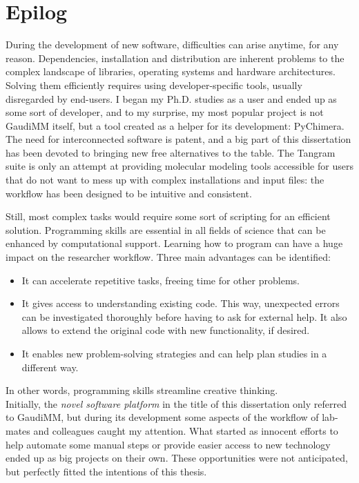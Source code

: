 \chapter*{Epilog}
\label{chap:epilog}

During the development of new software, difficulties can arise anytime, for any reason. Dependencies, installation and distribution are inherent problems to the complex landscape of libraries, operating systems and hardware architectures. Solving them efficiently requires using developer-specific tools, usually disregarded by end-users. I began my Ph.D. studies as a user and ended up as some sort of developer, and to my surprise, my most popular project is not GaudiMM itself, but a tool created as a helper for its development: PyChimera. The need for interconnected software is patent, and a big part of this dissertation has been devoted to bringing new free alternatives to the table. The Tangram suite is only an attempt at providing molecular modeling tools accessible for users that do not want to mess up with complex installations and input files: the workflow has been designed to be intuitive and consistent.

Still, most complex tasks would require some sort of scripting for an efficient solution. Programming skills are essential in all fields of science that can be enhanced by computational support. Learning how to program can have a huge impact on the researcher workflow. Three main advantages can be identified:

\begin{itemize}
    \item It can accelerate repetitive tasks, freeing time for other problems.
    \item It gives access to understanding existing code. This way, unexpected errors can be investigated thoroughly before having to ask for external help. It also allows to extend the original code with new functionality, if desired.
    \item It enables new problem-solving strategies and can help plan studies in a different way.
\end{itemize}

In other words, programming skills streamline creative thinking. \\

Initially, the \textit{novel software platform} in the title of this dissertation only referred to GaudiMM, but during its development some aspects of the workflow of lab-mates and colleagues caught my attention. What started as innocent efforts to help automate some manual steps or provide easier access to new technology ended up as big projects on their own. These opportunities were not anticipated, but perfectly fitted the intentions of this thesis.

